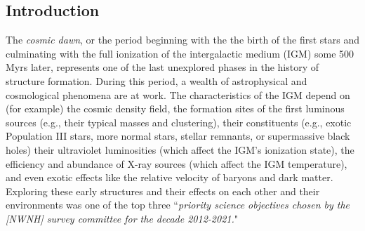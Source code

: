 \documentclass[preprint]{aastex}
\begin{document}
\subsection{Introduction}    %


The {\it cosmic dawn}, or the period beginning with the the birth of the first stars and culminating with the full
ionization of the intergalactic medium (IGM) some 500 Myrs later, represents one of the last unexplored phases in 
the history of structure formation. During this period, a wealth of astrophysical and cosmological phenomena are at 
work. The characteristics of the IGM depend on (for example) the cosmic density field, the formation sites of the 
first luminous sources (e.g., their typical masses and clustering), their constituents (e.g., exotic Population III 
stars, more normal stars, stellar remnants, or supermassive black holes) their ultraviolet luminosities (which affect 
the IGM's ionization state), the efficiency and abundance of X-ray sources (which affect the IGM temperature), and 
even exotic effects like the relative velocity of baryons and dark matter.  Exploring these early structures and their 
effects on each other and their environments was one of the top three ``{\it priority science objectives chosen by 
the [NWNH] survey committee for the decade 2012-2021.}"
\end{document}
